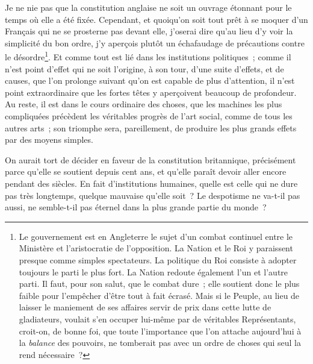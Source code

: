 \documentclass[french,twoside]{book} %
\begin{document}
Je ne nie pas que la constitution anglaise ne soit un ouvrage étonnant pour le temps où elle a été fixée. Cependant, et quoiqu’on soit tout prêt à se moquer d’un Français qui ne se prosterne pas devant elle, j’oserai dire qu’au lieu d’y voir la simplicité du bon ordre, j’y aperçois plutôt un échafaudage de précautions contre le désordre\footnote{Le gouvernement est en Angleterre le sujet d’un combat continuel entre le Ministère et l’aristocratie de l’opposition. La Nation et le Roi y paraissent presque comme simples spectateurs. La politique du Roi consiste à adopter toujours le parti le plus fort. La Nation redoute également l’un et l’autre parti. Il faut, pour son salut, que le combat dure ; elle soutient donc le plus faible pour l’empêcher d’être tout à fait écrasé. Mais si le Peuple, au lieu de laisser le maniement de ses affaires servir de prix dans cette lutte de gladiateurs, voulait s’en occuper lui-même par de véritables Représentants, croit-on, de bonne foi, que toute l’importance que l’on attache aujourd’hui à la {\itshape balance} des pouvoirs, ne tomberait pas avec un ordre de choses qui seul la rend nécessaire ?}. Et comme tout est lié dans les institutions politiques ; comme il n’est point d’effet qui ne soit l’origine, à son tour, d’une suite d’effets, et de causes, que l’on prolonge suivant qu’on est capable de plus d’attention, il n’est point extraordinaire que les fortes têtes y aperçoivent beaucoup de profondeur. Au reste, il est dans le cours ordinaire des choses, que les machines les plus compliquées précèdent les véritables progrès de l’art social, comme de tous les autres arts ; son triomphe sera, pareillement, de produire les plus grands effets par des moyens simples.\par
On aurait tort de décider en faveur de la constitution britannique, précisément parce qu’elle se soutient depuis cent ans, et qu’elle paraît devoir aller encore pendant des siècles. En fait d’institutions humaines, quelle est celle qui ne dure pas très longtemps, quelque mauvaise qu’elle soit ? Le despotisme ne va-t-il pas aussi, ne semble-t-il pas éternel dans la plus grande partie du monde ?\par
\end{document}
